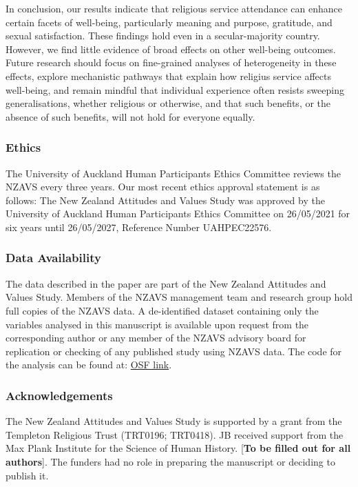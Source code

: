 \documentclass[
  single column]{article}
\begin{document}
In conclusion, our results indicate that religious service attendance
can enhance certain facets of well-being, particularly meaning and
purpose, gratitude, and sexual satisfaction. These findings hold even in
a secular-majority country. However, we find little evidence of broad
effects on other well-being outcomes. Future research should focus on
fine-grained analyses of heterogeneity in these effects, explore
mechanistic pathways that explain how religius service affects
well-being, and remain mindful that individual experience often resists
sweeping generalisations, whether religious or otherwise, and that such
benefits, or the absence of such benefits, will not hold for everyone
equally.

\subsubsection{Ethics}\label{ethics}

The University of Auckland Human Participants Ethics Committee reviews
the NZAVS every three years. Our most recent ethics approval statement
is as follows: The New Zealand Attitudes and Values Study was approved
by the University of Auckland Human Participants Ethics Committee on
26/05/2021 for six years until 26/05/2027, Reference Number UAHPEC22576.

\subsubsection{Data Availability}\label{data-availability}

The data described in the paper are part of the New Zealand Attitudes
and Values Study. Members of the NZAVS management team and research
group hold full copies of the NZAVS data. A de-identified dataset
containing only the variables analysed in this manuscript is available
upon request from the corresponding author or any member of the NZAVS
advisory board for replication or checking of any published study using
NZAVS data. The code for the analysis can be found at:
\href{https://osf.io/wgtz4/}{OSF link}.

\subsubsection{Acknowledgements}\label{acknowledgements}

The New Zealand Attitudes and Values Study is supported by a grant from
the Templeton Religious Trust (TRT0196; TRT0418). JB received support
from the Max Plank Institute for the Science of Human History.
{[}\textbf{To be filled out for all authors}{]}. The funders had no role
in preparing the manuscript or deciding to publish it.
\end{document}

